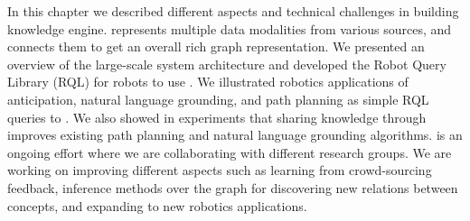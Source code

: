 In this chapter we described different aspects and technical challenges in building \robobrain{} knowledge engine. \robobrain{} represents multiple data modalities from various sources, and connects them to get an overall rich graph representation.  We presented an overview of the \robobrain{} large-scale system architecture and developed the Robot Query Library (RQL) for robots to use \robobrain{}. We illustrated robotics applications of anticipation, natural language grounding, and path planning as simple RQL queries to \robobrain{}. We also showed in experiments that sharing knowledge through \robobrain{} improves existing path planning and natural language grounding algorithms.
 \robobrain{} is an ongoing effort where we are collaborating with different research groups. We are working on improving different aspects such as learning from crowd-sourcing feedback, inference methods over the graph for discovering new relations between concepts, and expanding \robobrain{} to new robotics applications.

